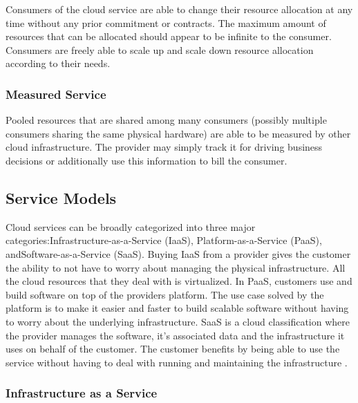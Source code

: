 \documentclass[12pt]{article}
\begin{document}
Consumers of the cloud service are able to change their resource allocation at any time without any prior commitment or contracts. The maximum amount of resources that can be allocated should appear to be infinite to the consumer. Consumers are freely able to scale up and scale down resource allocation according to their needs.


\subsubsection{Measured Service} \label{ssub:measured-service}

Pooled resources that are shared among many consumers (possibly multiple consumers sharing the same physical hardware) are able to be measured by other cloud infrastructure. The provider may simply track it for driving business decisions or additionally use this information to bill the consumer.



\subsection{Service Models} \label{sub:servicemodels}

Cloud services can be broadly categorized into three major categories:\linebreak Infrastructure-as-a-Service (IaaS), Platform-as-a-Service (PaaS), and\linebreak Software-as-a-Service (SaaS). Buying IaaS from a provider gives the customer the ability to not have to worry about managing the physical infrastructure. All the cloud resources that they deal with is virtualized. In PaaS, customers use and build software on top of the providers platform. The use case solved by the platform is to make it easier and faster to build scalable software without having to worry about the underlying infrastructure. SaaS is a cloud classification where the provider manages the software, it's associated data and the infrastructure it uses on behalf of the customer. The customer benefits by being able to use the service without having to deal with running and maintaining the infrastructure \cite{Manvi2014}.

\subsubsection{Infrastructure as a Service} \label{ssub:iaas}
\end{document}

